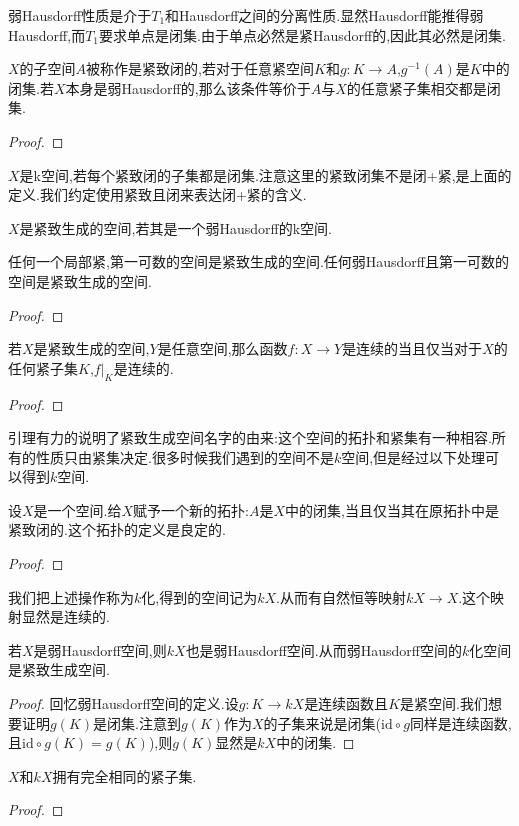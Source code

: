 弱Hausdorff性质是介于$T_1$和Hausdorff之间的分离性质.显然Hausdorff能推得弱Hausdorff,而$T_1$要求单点是闭集.由于单点必然是紧Hausdorff的,因此其必然是闭集.

\begin{definition}
    $X$的子空间$A$被称作是紧致闭的,若对于任意紧空间$K$和$g:K \to A$,$g^{-1}(A)$是$K$中的闭集.若$X$本身是弱Hausdorff的,那么该条件等价于$A$与$X$的任意紧子集相交都是闭集.
\end{definition}
\begin{proof}
    
\end{proof}
\begin{definition}
    $X$是k空间,若每个紧致闭的子集都是闭集.注意这里的紧致闭集不是闭+紧,是上面的定义.我们约定使用紧致且闭来表达闭+紧的含义.
\end{definition}

\begin{definition}
    $X$是紧致生成的空间,若其是一个弱Hausdorff的k空间.
\end{definition}
\begin{example}
    任何一个局部紧,第一可数的空间是紧致生成的空间.任何弱Hausdorff且第一可数的空间是紧致生成的空间.
\end{example}
\begin{proof}
    
\end{proof}
\begin{lemma}
    若$X$是紧致生成的空间,$Y$是任意空间,那么函数$f:X \to Y$是连续的当且仅当对于$X$的任何紧子集$K$,$f|_K$是连续的.
\end{lemma}
\begin{proof}
    
\end{proof}
引理有力的说明了紧致生成空间名字的由来:这个空间的拓扑和紧集有一种相容.所有的性质只由紧集决定.很多时候我们遇到的空间不是$k$空间,但是经过以下处理可以得到$k$空间.
\begin{proposition}
    设$X$是一个空间.给$X$赋予一个新的拓扑:$A$是$X$中的闭集,当且仅当其在原拓扑中是紧致闭的.这个拓扑的定义是良定的.
\end{proposition}
\begin{proof}
    
\end{proof}
我们把上述操作称为$k$化,得到的空间记为$kX$.从而有自然恒等映射$kX \to X$.这个映射显然是连续的.
\begin{proposition}
    若$X$是弱Hausdorff空间,则$kX$也是弱Hausdorff空间.从而弱Hausdorff空间的$k$化空间是紧致生成空间.
\end{proposition}
\begin{proof}
    回忆弱Hausdorff空间的定义.设$g:K \to kX$是连续函数且$K$是紧空间.我们想要证明$g(K)$是闭集.注意到$g(K)$作为$X$的子集来说是闭集($\mathrm{id}\circ g$同样是连续函数,且$\mathrm{id}\circ g(K)=g(K)$),则$g(K)$显然是$kX$中的闭集.
\end{proof}
\begin{proposition}
    $X$和$kX$拥有完全相同的紧子集.
\end{proposition}
\begin{proof}
    
\end{proof}

